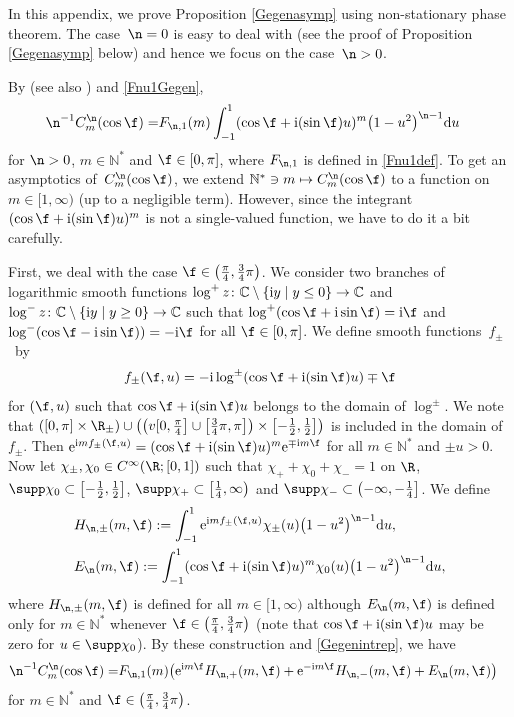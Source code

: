 In this appendix, we prove Proposition \ref{Gegenasymp} using non-stationary phase theorem. The case~${\n=0}$ is easy to deal with (see the proof of Proposition \ref{Gegenasymp} below) and hence we focus on the case~${\n>0}$.

By \cite[equation~(4.30)]{BKO} (see also \cite[Section 10]{IJ}) and \eqref{Fnu1Gegen},
\begin{align}\label{Gegenintrep}
\n^{-1}C_m^{\n}(\cos\f)=&F_{\n,1}(m)\int_{-1}^{1}(\cos\f+{\rm i}(\sin\f)u)^m\bigl(1-u^2\bigr)^{\n-1}{\rm d}u
\end{align}
for $\n>0$, $m\in\mathbb{N}^*$ and $\f\in [0,\pi]$, where $F_{\n,1}$ is defined in \eqref{Fnu1def}. To get an asymptotics of~$C_m^{\n}(\cos\f)$, we extend $\mathbb{N}^*\ni m\mapsto C_m^{\n}(\cos\f)$ to a function on $m\in [1,\infty)$ (up to a negligible term). However, since the integrant $(\cos\f+{\rm i}(\sin\f)u)^m$ is not a single-valued function, we have to do it a bit carefully.

First, we deal with the case $\f\in \bigl(\frac{\pi}{4}, \frac{3}{4}\pi\bigr)$.
We consider two branches of logarithmic smooth functions $\log^+z\colon\mathbb{C}\setminus \{{\rm i}y\mid y\leq 0\}\to \mathbb{C}$ and $\log^-z\colon\mathbb{C}\setminus \{{\rm i}y\mid y\geq 0\}\to \mathbb{C}$ such that $\log^+(\cos \f+{\rm i}\sin \f)={\rm i}\f$ and $\log^-(\cos\f-{\rm i}\sin\f))=-{\rm i}\f$ for all $\f\in [0,\pi]$. We define smooth functions~$f_{\pm}$~by
\begin{align*}
f_{\pm}(\f,u)=-{\rm i}\log^{\pm}(\cos\f+{\rm i}(\sin\f)u)\mp \f
\end{align*}
for $(\f,u)$ such that $\cos\f+{\rm i}(\sin\f)u$ belongs to the domain of $\log^{\pm}$. We note that
$([0,\pi]\times \R_{\pm})\cup \bigl(\bigl(v[0,\frac{\pi}{4}\bigr]\cup \bigl[\frac{3}{4}\pi,\pi\bigr]\bigr)\times \bigl[-\frac{1}{2},\frac{1}{2}\bigr] \bigr)$ is included in the domain of $f_{\pm}$.
Then ${\rm e}^{{\rm i}mf_{\pm}(\f,u)}=(\cos\f+{\rm i}(\sin\f)u)^m{\rm e}^{\mp {\rm i}m\f}$ for all $m\in\mathbb{N}^*$ and $\pm u>0$.
Now let $\chi_{\pm},\chi_0\in C^{\infty}(\R;[0,1])$ such that $\chi_++\chi_0+\chi_-=1$ on $\R$, $\supp\chi_0\subset \bigl[-\frac{1}{2},\frac{1}{2}\bigr]$, $\supp \chi_+\subset \bigl[\frac{1}{4},\infty\bigr)$ and $\supp\chi_-\subset \bigl(-\infty,-\frac{1}{4}\bigr]$. We define
\begin{align*}
&H_{\n,\pm}(m,\f):=\int_{-1}^1{\rm e}^{{\rm i}mf_{\pm}(\f,u)}\chi_{\pm}(u)\bigl(1-u^2\bigr)^{\n-1}{\rm d}u,\\
&E_{\n}(m,\f):=\int_{-1}^1(\cos \f+{\rm i}(\sin\f)u)^m\chi_{0}(u)\bigl(1-u^2\bigr)^{\n-1}{\rm d}u,
\end{align*}
where $H_{\n,\pm}(m,\f)$ is defined for all $m\in [1,\infty)$ although $E_{\n}(m,\f)$ is defined only for $m\in \mathbb{N}^*$ whenever $\f\in \bigl(\frac{\pi}{4}, \frac{3}{4}\pi\bigr)$ (note that $\cos\f+{\rm i}(\sin \f)u$ may be zero for $u\in \supp \chi_0$). By these construction and \eqref{Gegenintrep}, we have
\begin{align}\label{Gegendecom}
\n^{-1}C_m^{\n}(\cos\f)=&F_{\n,1}(m)\bigl({\rm e}^{{\rm i}m\f}H_{\n,+}(m,\f)+{\rm e}^{-{\rm i}m\f}H_{\n,-}(m,\f)+E_{\n}(m,\f) \bigr)
\end{align}
for $m\in\mathbb{N}^*$ and $\f\in \bigl(\frac{\pi}{4}, \frac{3}{4}\pi\bigr)$.

